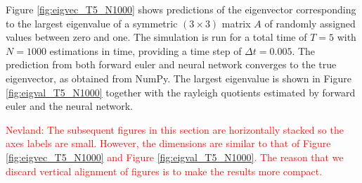 \documentclass[12pt]{extarticle}
\begin{document}
Figure \ref{fig:eigvec_T5_N1000} shows predictions of the eigenvector corresponding to the largest eigenvalue of a symmetric $(3\times 3)$ matrix $A$ of randomly assigned values between zero and one. The simulation is run for a total time of $T=5$ with $N=1000$ estimations in time, providing a time step of $\Delta t = 0.005$. The prediction from both forward euler and neural network converges to the true eigenvector, as obtained from NumPy. The largest eigenvalue is shown in Figure \ref{fig:eigval_T5_N1000} together with the rayleigh quotients estimated by forward euler and the neural network.

\textcolor{red}{Nevland: The subsequent figures in this section are horizontally stacked so the axes labels are small. However, the dimensions are similar to that of Figure \ref{fig:eigvec_T5_N1000} and Figure \ref{fig:eigval_T5_N1000}. The reason that we discard vertical alignment of figures is to make the results more compact.}
\end{document}

